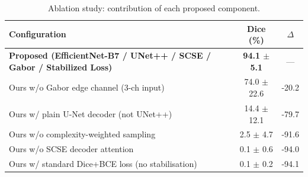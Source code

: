 \begin{table}[t]
\centering
\caption{Ablation study: contribution of each proposed component.}
\label{tab:ablation}
\begin{tabular}{lcc}
\toprule
Configuration & Dice (\%) & $\Delta$ \\
\midrule
\textbf{Proposed (EfficientNet-B7 / UNet++ / SCSE / Gabor / Stabilized Loss)} & \textbf{94.1 $\pm$ 5.1} & --- \\
Ours w/o Gabor edge channel (3-ch input) & 74.0 $\pm$ 22.6 & -20.2 \\
Ours w/ plain U-Net decoder (not UNet++) & 14.4 $\pm$ 12.1 & -79.7 \\
Ours w/o complexity-weighted sampling & 2.5 $\pm$ 4.7 & -91.6 \\
Ours w/o SCSE decoder attention & 0.1 $\pm$ 0.6 & -94.0 \\
Ours w/ standard Dice+BCE loss (no stabilisation) & 0.1 $\pm$ 0.2 & -94.1 \\
\bottomrule
\end{tabular}
\end{table}